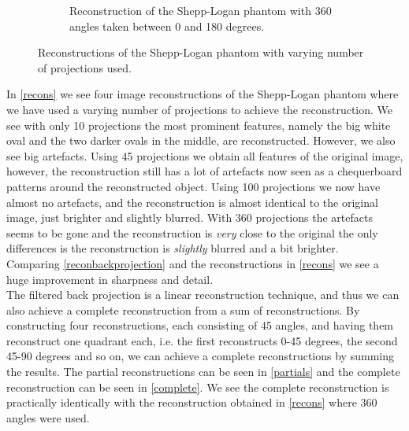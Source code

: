 \begin{figure}
\begin{subfigure}{0.48\linewidth}
		\caption{Reconstruction of the Shepp-Logan phantom with 360 angles taken between 0 and 180 degrees.}
	\end{subfigure}
	\caption{Reconstructions of the Shepp-Logan phantom with varying number of projections used.}
	\label{recons}
\end{figure}
In \autoref{recons} we see four image reconstructions of the Shepp-Logan phantom where we have used a varying number of projections to achieve the reconstruction. We see with only 10 projections the most prominent features, namely the big white oval and the two darker ovals in the middle, are reconstructed. However, we also see big artefacts. Using 45 projections we obtain all features of the original image, however, the reconstruction still has a lot of artefacts now seen as a chequerboard patterns around the reconstructed object. Using 100 projections we now have almost no artefacts, and the reconstruction is almost identical to the original image, just brighter and slightly blurred. With 360 projections the artefacts seems to be gone and the reconstruction is \textit{very} close to the original the only differences is the reconstruction is \textit{slightly} blurred and a bit brighter.\\
Comparing \autoref{reconbackprojection} and the reconstructions in \autoref{recons} we see a huge improvement in sharpness and detail.\\
The filtered back projection is a linear reconstruction technique, and thus we can also achieve a complete reconstruction from a sum of reconstructions. By constructing four reconstructions, each consisting of 45 angles, and having them reconstruct one quadrant each, i.e. the first reconstructs 0-45 degrees, the second 45-90 degrees and so on, we can achieve a complete reconstructions by summing the results. The partial reconstructions can be seen in \autoref{partials} and the complete reconstruction can be seen in \autoref{complete}. We see the complete reconstruction is practically identically with the reconstruction obtained in \autoref{recons} where 360 angles were used.
